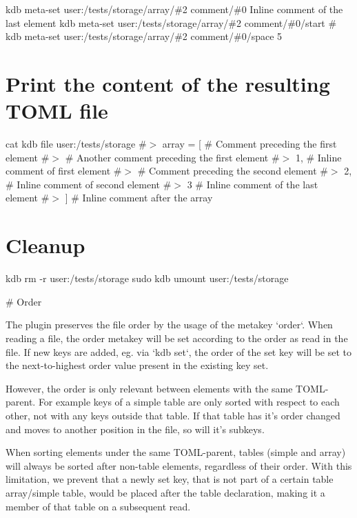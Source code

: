 kdb meta-\/set \textquotesingle{}user\+:/tests/storage/array/\#2\textquotesingle{} \textquotesingle{}comment/\#0\textquotesingle{} \textquotesingle{} Inline comment of the last element\textquotesingle{} kdb meta-\/set \textquotesingle{}user\+:/tests/storage/array/\#2\textquotesingle{} \textquotesingle{}comment/\#0/start\textquotesingle{} \textquotesingle{}\#\textquotesingle{} kdb meta-\/set \textquotesingle{}user\+:/tests/storage/array/\#2\textquotesingle{} \textquotesingle{}comment/\#0/space\textquotesingle{} \textquotesingle{}5\textquotesingle{}\hypertarget{autotoc_md642_autotoc_md738}{}\section{Print the content of the resulting T\+O\+M\+L file}\label{autotoc_md642_autotoc_md738}
cat {\ttfamily kdb file user\+:/tests/storage} \#$>$ array = \mbox{[} \# Comment preceding the first element \#$>$ \# Another comment preceding the first element \#$>$ 1, \# Inline comment of first element \#$>$ \# Comment preceding the second element \#$>$ 2, \# Inline comment of second element \#$>$ 3 \# Inline comment of the last element \#$>$ \mbox{]} \# Inline comment after the array\hypertarget{autotoc_md642_autotoc_md739}{}\section{Cleanup}\label{autotoc_md642_autotoc_md739}
kdb rm -\/r user\+:/tests/storage sudo kdb umount user\+:/tests/storage 
\begin{DoxyCode}
# Order

The plugin preserves the file order by the usage of the metakey `order`. When reading a file, the order
       metakey will be set according to the order as read in the file.
If new keys are added, eg. via `kdb set`, the order of the set key will be set to the next-to-highest order
       value present in the existing key set.

However, the order is only relevant between elements with the same TOML-parent. For example keys of a
       simple table are only sorted with respect to each other, not with any keys outside that table. If that table has
       it's order changed and moves to another position in the file, so will it's subkeys.

When sorting elements under the same TOML-parent, tables (simple and array) will always be sorted after
       non-table elements, regardless of their order.
With this limitation, we prevent that a newly set key, that is not part of a certain table array/simple
       table, would be placed after the table declaration, making it a member of that table on a subsequent read.
\end{DoxyCode}
